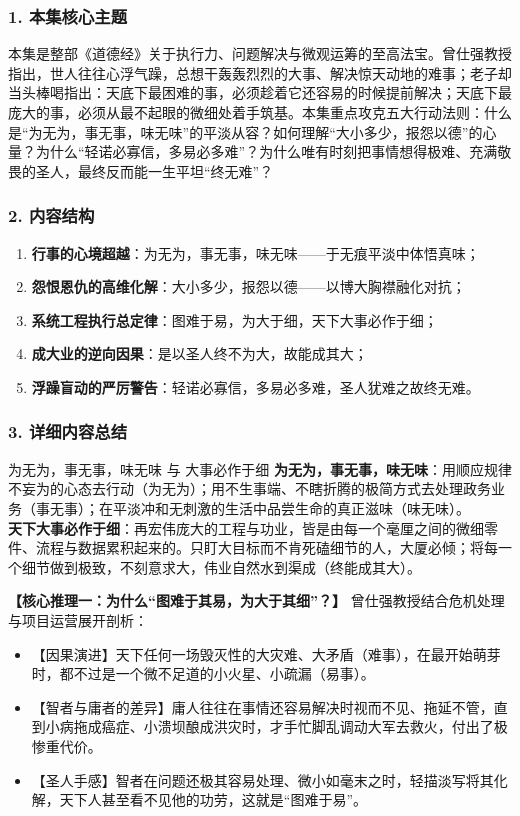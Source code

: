 \subsubsection{1. 本集核心主题}
本集是整部《道德经》关于执行力、问题解决与微观运筹的至高法宝。曾仕强教授指出，世人往往心浮气躁，总想干轰轰烈烈的大事、解决惊天动地的难事；老子却当头棒喝指出：天底下最困难的事，必须趁着它还容易的时候提前解决；天底下最庞大的事，必须从最不起眼的微细处着手筑基。本集重点攻克五大行动法则：什么是“为无为，事无事，味无味”的平淡从容？如何理解“大小多少，报怨以德”的心量？为什么“轻诺必寡信，多易必多难”？为什么唯有时刻把事情想得极难、充满敬畏的圣人，最终反而能一生平坦“终无难”？

\subsubsection{2. 内容结构}
\begin{enumerate}
    \item \textbf{行事的心境超越}：为无为，事无事，味无味——于无痕平淡中体悟真味；
    \item \textbf{怨恨恩仇的高维化解}：大小多少，报怨以德——以博大胸襟融化对抗；
    \item \textbf{系统工程执行总定律}：图难于易，为大于细，天下大事必作于细；
    \item \textbf{成大业的逆向因果}：是以圣人终不为大，故能成其大；
    \item \textbf{浮躁盲动的严厉警告}：轻诺必寡信，多易必多难，圣人犹难之故终无难。
\end{enumerate}

\subsubsection{3. 详细内容总结}

\begin{ConceptBox}{为无为，事无事，味无味 与 大事必作于细}
\textbf{为无为，事无事，味无味}：用顺应规律不妄为的心态去行动（为无为）；用不生事端、不瞎折腾的极简方式去处理政务业务（事无事）；在平淡冲和无刺激的生活中品尝生命的真正滋味（味无味）。\\
\textbf{天下大事必作于细}：再宏伟庞大的工程与功业，皆是由每一个毫厘之间的微细零件、流程与数据累积起来的。只盯大目标而不肯死磕细节的人，大厦必倾；将每一个细节做到极致，不刻意求大，伟业自然水到渠成（终能成其大）。
\end{ConceptBox}

\noindent\textbf{【核心推理一：为什么“图难于其易，为大于其细”？】}
曾仕强教授结合危机处理与项目运营展开剖析：
\begin{itemize}
    \item 【因果演进】天下任何一场毁灭性的大灾难、大矛盾（难事），在最开始萌芽时，都不过是一个微不足道的小火星、小疏漏（易事）。
    \item 【智者与庸者的差异】庸人往往在事情还容易解决时视而不见、拖延不管，直到小病拖成癌症、小溃坝酿成洪灾时，才手忙脚乱调动大军去救火，付出了极惨重代价。
    \item 【圣人手感】智者在问题还极其容易处理、微小如毫末之时，轻描淡写将其化解，天下人甚至看不见他的功劳，这就是“图难于易”。
\end{itemize}

